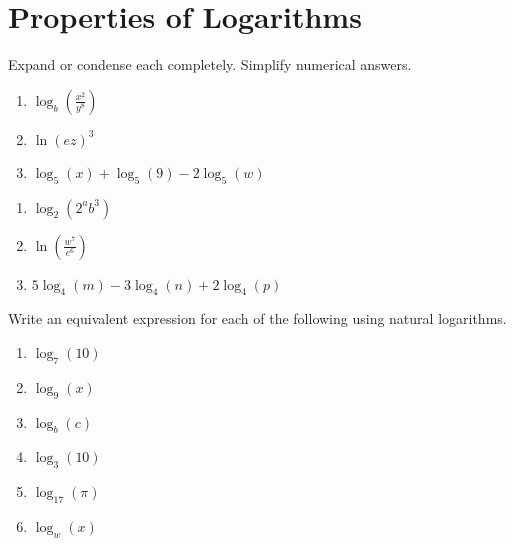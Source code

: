 \chapter{Properties of Logarithms}

Expand or condense each completely. Simplify numerical answers.
\begin{multicols}{3}
\begin{enumerate}
	\item $\log_b\left(\frac{x^2}{y^8}\right)$
	\item $\ln\left(ez\right)^3$	
	\item $\log_5(x) + \log_5(9) - 2\log_5(w)$	
\end{enumerate}	\setcounter{Review}{\value{enumi}}
\end{multicols}
\begin{multicols}{3}
\begin{enumerate}	\setcounter{enumi}{\value{Review}}
	\item $\log_2\left(2^ab^3\right)$	
	\item $\ln\left(\frac{w^7}{e^6}\right)$
	\item $5\log_4(m) - 3\log_4(n) + 2\log_4(p)$	
\setcounter{Review}{\value{enumi}}
\end{enumerate}
\end{multicols}
\bigskip

Write an equivalent expression for each of the following using natural logarithms.
\begin{multicols}{6}
\begin{enumerate}
\setcounter{enumi}{\value{Review}}
	\item $\log_7(10)$
	\item $\log_9(x)$
	\item $\log_b(c)$
    \item $\log_3(10)$
    \item $\log_{17}(\pi)$    
    \item $\log_{w}(x)$
\setcounter{Review}{\value{enumi}}
\end{enumerate}
\end{multicols}
\bigskip

